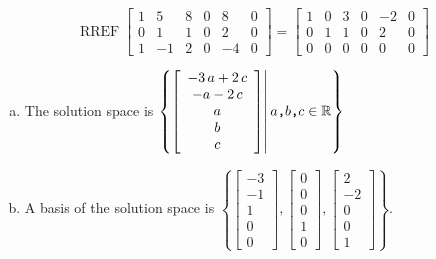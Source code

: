 \begin{exerciseAnswer} 


\[\operatorname{RREF} \left[\begin{array}{ccccc|c}
1 & 5 & 8 & 0 & 8 & 0 \\
0 & 1 & 1 & 0 & 2 & 0 \\
1 & -1 & 2 & 0 & -4 & 0
\end{array}\right] = \left[\begin{array}{ccccc|c}
1 & 0 & 3 & 0 & -2 & 0 \\
0 & 1 & 1 & 0 & 2 & 0 \\
0 & 0 & 0 & 0 & 0 & 0
\end{array}\right] \]


\begin{enumerate}[(a)]
\item The solution space is \( \left\{ \left[\begin{array}{c}
-3 \, a + 2 \, c \\
-a - 2 \, c \\
a \\
b \\
c
\end{array}\right] \middle|\,a\text{\texttt{,}}b\text{\texttt{,}}c\in\mathbb{R}\right\} \)
\item A basis of the solution space is \( \left\{ \left[\begin{array}{c}
-3 \\
-1 \\
1 \\
0 \\
0
\end{array}\right] , \left[\begin{array}{c}
0 \\
0 \\
0 \\
1 \\
0
\end{array}\right] , \left[\begin{array}{c}
2 \\
-2 \\
0 \\
0 \\
1
\end{array}\right] \right\} \).
\end{enumerate}
    
\end{exerciseAnswer}
    
